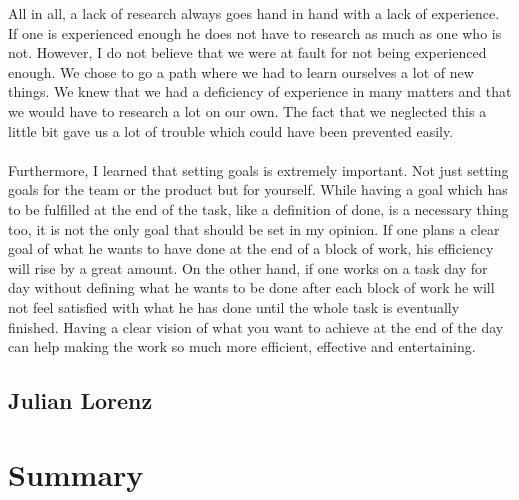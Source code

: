 All in all, a lack of research always goes hand in hand with a lack of experience. If one is experienced enough he does not have to research as much as one who is not. However, I do not believe that we were at fault for not being experienced enough. We chose to go a path where we had to learn ourselves a lot of new things. We knew that we had a deficiency of experience in many matters and that we would have to research a lot on our own. The fact that we neglected this a little bit gave us a lot of trouble which could have been prevented easily.

\paragraph{}
Furthermore, I learned that setting goals is extremely important. Not just setting goals for the team or the product but for yourself. While having a goal which has to be fulfilled at the end of the task, like a definition of done, is a necessary thing too, it is not the only goal that should be set in my opinion. If one plans a clear goal of what he wants to have done at the end of a block of work, his efficiency will rise by a great amount. On the other hand, if one works on a task day for day without defining what he wants to be done after each block of work he will not feel satisfied with what he has done until the whole task is eventually finished. Having a clear vision of what you want to achieve at the end of the day can help making the work so much more efficient, effective and entertaining.

\subsection{Julian Lorenz}

\section{Summary}
